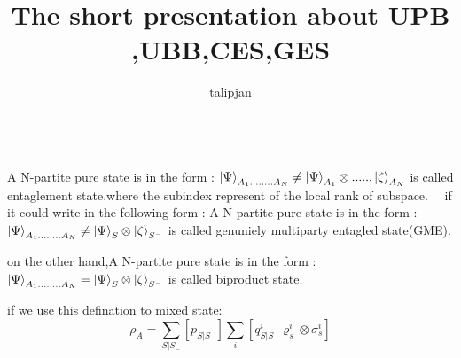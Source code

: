 \documentclass[a4paper,12pt]{article}
\title{The short presentation about UPB ,UBB,CES,GES}
\author{talipjan}
\begin{document}
\leavevmode
\newline \\
A N-partite pure  state is in the form :
$ \ket{\Psi} _{A_{1}........A_{N}}\neq\ket{\Psi}_{A_{1}}\otimes......\Ket{\zeta}_{A_{N}}$ is called entaglement state.where the subindex represent of the local rank of subspace.
\  \  if it could write in the following form :
A N-partite pure  state is in the form :
$ \ket{\Psi} _{A_{1}........A_{N}}\neq\ket{\Psi}_{S}\otimes \Ket{\zeta}_{S^{-}}$ is called genuniely multiparty entagled state(GME).


on the other hand,A N-partite pure  state is in the form :
$ \ket{\Psi} _{A_{1}........A_{N}}=\ket{\Psi}_{S}\otimes\Ket{\zeta}_{S^{-}}$ is called biproduct state.

if we use this defination to mixed state:
\begin{equation}
\rho_{A}= \sum_{S|S_{-}}^{} [p_{S|S_{-}}] \sum_{i}^{} [q^{i}_{S|S_{-}}\varrho^{i}_{s}\otimes\sigma^{i}_{s}]
\end{equation}
 $ $
\end{document}
